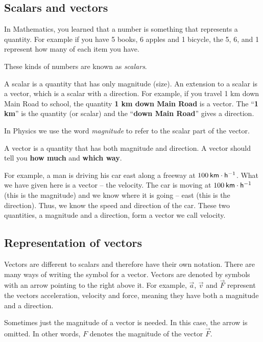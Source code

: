             \subsection*{Scalars and vectors}
            \nopagebreak
      \label{m38812*id186720}In Mathematics, you learned that a number is something that represents a quantity. For example if you have 5 books, 6 apples and 1 bicycle, the 5, 6, and 1 represent how many of each item you have.\par 
      \label{m38812*id186725}These kinds of numbers are known as \textsl{scalars}.\par 
{} {A scalar is a quantity that has only magnitude (size).  } 
      \label{m38812*id186750}An extension to a scalar is a vector, which is a scalar with a direction. For example, if you travel 1 km down Main Road to school, the quantity \textbf{1 km down Main Road} is a vector. The ``\textbf{1 km}'' is the quantity (or scalar) and the ``\textbf{down Main Road}'' gives a direction.\par 
      \label{m38812*id186771}In Physics we use the word \textsl{magnitude} to refer to the scalar part of the vector.\par 
{} { A vector is a quantity that has both magnitude and direction.  } 
      \label{m38812*id186797}A vector should tell you \textbf{how much} and \textbf{which way}.\par 
      \label{m38812*id186810}For example, a man is driving his car east along a freeway at $100\phantom{\rule{2pt}{0ex}}\mathsf{km}\ensuremath{\cdot}\mathsf{h}{}^{-1}$. What we have given here is a vector -- the velocity. The car is moving at $100\phantom{\rule{2pt}{0ex}}\mathsf{km}\ensuremath{\cdot}\mathsf{h}{}^{-1}$ (this is the magnitude) and we know where it is going -- east (this is the direction). Thus, we know the speed and direction of the car. These two quantities, a magnitude and a direction, form a vector we call velocity.\par 
    \label{m38812*cid4}
      \label{m38812*uid1}
            \subsection*{Representation of vectors}
            \nopagebreak
        \label{m38812*id186887}Vectors are different to scalars and therefore have their own notation. There are many ways of writing the symbol for a vector. Vectors are denoted by symbols with an arrow pointing to the right above it. For example, $\stackrel{\to }{a}$, $\stackrel{\to }{v}$ and $\stackrel{\to }{F}$ represent the vectors acceleration, velocity and force, meaning they have both a magnitude and a direction.\par 
        \label{m38812*id186935}Sometimes just the magnitude of a vector is needed. In this case, the arrow is omitted. In other words, $F$ denotes the magnitude of the vector $\stackrel{\to }{F}$. \par 
      \label{m38812*uid2}

